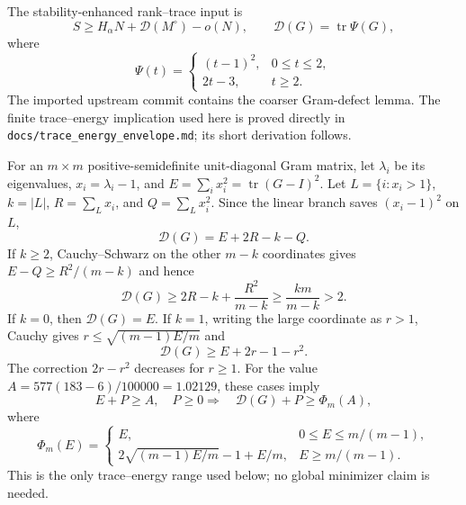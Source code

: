 \documentclass[11pt]{article}
\newcommand{\tr}{\operatorname{tr}}
\begin{document}
The stability-enhanced rank--trace input is
\begin{equation}
 S\ge H_\alpha N+\mathcal D(M^\circ)-o(N),
 \qquad \mathcal D(G)=\tr\Psi(G),
 \label{eq:ranktrace}
\end{equation}
where
\begin{equation}
 \Psi(t)=\begin{cases}(t-1)^2,&0\le t\le2,\\2t-3,&t\ge2.
 \end{cases}
 \label{eq:psi}
\end{equation}
The imported upstream commit contains the coarser Gram-defect lemma.  The
finite trace--energy implication used here is proved directly in
\texttt{docs/trace\_energy\_envelope.md}; its short derivation follows.

For an $m\times m$ positive-semidefinite unit-diagonal Gram matrix, let
$\lambda_i$ be its eigenvalues, $x_i=\lambda_i-1$, and
$E=\sum_i x_i^2=\tr(G-I)^2$.  Let $L=\{i:x_i>1\}$, $k=|L|$,
$R=\sum_Lx_i$, and $Q=\sum_Lx_i^2$.  Since the linear branch saves
$(x_i-1)^2$ on $L$,
\begin{equation}
 \mathcal D(G)=E+2R-k-Q.
 \label{eq:didentity}
\end{equation}
If $k\ge2$, Cauchy--Schwarz on the other $m-k$ coordinates gives
$E-Q\ge R^2/(m-k)$ and hence
\begin{equation}
 \mathcal D(G)\ge2R-k+\frac{R^2}{m-k}\ge\frac{km}{m-k}>2.
 \label{eq:ksmall}
\end{equation}
If $k=0$, then $\mathcal D(G)=E$.  If $k=1$, writing the large coordinate
as $r>1$, Cauchy gives $r\le\sqrt{(m-1)E/m}$ and
\begin{equation}
 \mathcal D(G)\ge E+2r-1-r^2.
 \label{eq:kone}
\end{equation}
The correction $2r-r^2$ decreases for $r\ge1$.  For the value
$A=577(183-6)/100000=1.02129$, these cases imply
\begin{equation}
 E+P\ge A,\quad P\ge0
 \Longrightarrow\quad \mathcal D(G)+P\ge\Phi_m(A),
 \label{eq:phiimp}
\end{equation}
where
\begin{equation}
 \Phi_m(E)=\begin{cases}
 E,&0\le E\le m/(m-1),\\
 2\sqrt{(m-1)E/m}-1+E/m,&E\ge m/(m-1).
 \end{cases}
 \label{eq:phi}
\end{equation}
This is the only trace--energy range used below; no global minimizer claim is
needed.
\end{document}
